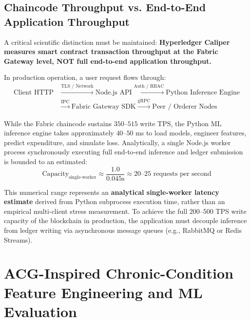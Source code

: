 \documentclass[runningheads]{llncs}
\begin{document}
\subsection{Chaincode Throughput vs. End-to-End Application Throughput}
A critical scientific distinction must be maintained: \textbf{Hyperledger Caliper measures smart contract transaction throughput at the Fabric Gateway level, NOT full end-to-end application throughput.}

In production operation, a user request flows through:
\begin{align}
\text{Client HTTP} &\xrightarrow{\text{TLS / Network}} \text{Node.js API} \xrightarrow{\text{Auth / RBAC}} \text{Python Inference Engine} \nonumber \\
&\xrightarrow{\text{IPC}} \text{Fabric Gateway SDK} \xrightarrow{\text{gRPC}} \text{Peer / Orderer Nodes}
\end{align}

While the Fabric chaincode sustains $350$--$515$ write TPS, the Python ML inference engine takes approximately $40$--$50$ ms to load models, engineer features, predict expenditure, and simulate loss. Analytically, a single Node.js worker process synchronously executing full end-to-end inference and ledger submission is bounded to an estimated:
\begin{equation}
\text{Capacity}_{\text{single-worker}} \approx \frac{1.0}{0.045\text{s}} \approx 20\text{--}25\text{ requests per second}
\end{equation}

This numerical range represents an \textbf{analytical single-worker latency estimate} derived from Python subprocess execution time, rather than an empirical multi-client stress measurement. To achieve the full $200$--$500$ TPS write capacity of the blockchain in production, the application must decouple inference from ledger writing via asynchronous message queues (e.g., RabbitMQ or Redis Streams).

\section{ACG-Inspired Chronic-Condition Feature Engineering and ML Evaluation}
\end{document}
